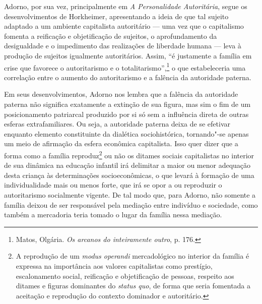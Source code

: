 Adorno, por sua vez, principalmente em \emph{A Personalidade
Autoritária}, segue os desenvolvimentos de Horkheimer, apresentando a
ideia de que tal sujeito adaptado a um ambiente capitalista autoritário
--- uma vez que o capitalismo fomenta a reificação e objetificação de
sujeitos, o aprofundamento da desigualdade e o impedimento das
realizações de liberdade humana --- leva à produção de sujeitos
igualmente autoritários. Assim, ``é justamente a família em crise que
favorece o autoritarismo e o totalitarismo'',\footnote{Matos, Olgária.
  \emph{Os arcanos do inteiramente outro}, p. 176.} o que estabeleceria
uma correlação entre o aumento do autoritarismo e a falência da
autoridade paterna.

Em seus desenvolvimentos, Adorno nos lembra que a falência da autoridade
paterna não significa exatamente a extinção de sua figura, mas sim o fim
de um posicionamento patriarcal produzido por si só sem a influência
direta de outras esferas extrafamiliares. Ou seja, a autoridade paterna
deixa de se efetivar enquanto elemento constituinte da dialética
sociohistórica, tornando"-se apenas um meio de afirmação da esfera
econômica capitalista. Isso quer dizer que a forma como a família
reproduz\footnote{A reprodução de um \emph{modus operandi} mercadológico
  no interior da família é expressa na importância aos valores
  capitalistas como prestígio, escalonamento social, reificação e
  objetificação de pessoas, respeito aos ditames e figuras dominantes do
  \emph{status quo}, de forma que seria fomentada a aceitação e
  reprodução do contexto dominador e autoritário.} ou não os ditames
sociais capitalistas no interior de sua dinâmica na educação infantil
irá delimitar a maior ou menor adequação desta criança às determinações
socioeconômicas, o que levará à formação de uma individualidade mais ou
menos forte, que irá se opor a ou reproduzir o autoritarismo socialmente
vigente. De tal modo que, para Adorno, não somente a família deixou de
ser responsável pela mediação entre indivíduo e sociedade, como também a
mercadoria teria tomado o lugar da família nessa mediação.

